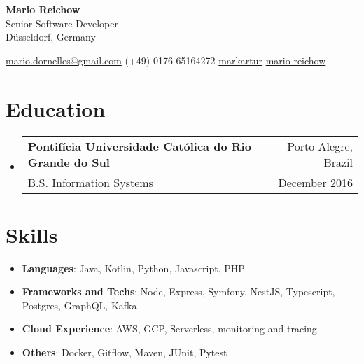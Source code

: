 \documentclass[letterpaper,11pt]{article}
\makeatletter
\newcommand{\resumeItem}[2]{
  \item\small{
    \textbf{#1}{: #2 \vspace{-2pt}}
  }
}
\newcommand{\resumeSubheading}[4]{
  \vspace{-1pt}\item
    \begin{tabular*}{0.98\textwidth}[t]{l@{\extracolsep{\fill}}r}
      \textbf{#1} & #2 \\
      {\small#3} & {\small #4} \\
    \end{tabular*}\vspace{-5pt}
}
\newcommand{\resumeSubItem}[2]{\resumeItem{#1}{#2}\vspace{-4pt}}
\renewcommand{\labelitemi}{}
\newcommand{\resumeSubHeadingListStart}{\begin{itemize}[leftmargin=*]}
\newcommand{\resumeSubHeadingListEnd}{\end{itemize}}
\makeatother
\begin{document}

\textbf{\LARGE Mario Reichow}\\
Senior Software Developer\\
Düsseldorf, Germany\\\vspace{\baselineskip}

{\Centering %

\raisebox{-0.20\height}{\Large \faInbox} \space \href{mailto:mario.dornelles@gmail.com}{mario.dornelles@gmail.com} \hfill %
\raisebox{-0.20\height}{\Large \faPhone} \space (+49) 0176 65164272 \hfill %
\raisebox{-0.20\height}{\Large \faGithub} \space \href{https://github.com/markartur}{markartur} \hfill %
\raisebox{-0.20\height}{\Large \faLinkedinSquare} \space \href{https://www.linkedin.com/in/mario-reichow/}{mario-reichow} %
} %


\section{Education}
  \resumeSubHeadingListStart
    \resumeSubheading
      {Pontifícia Universidade Católica do Rio Grande do Sul}{Porto Alegre, Brazil}
      {B.S. Information Systems}{December 2016}	
  \resumeSubHeadingListEnd



\section{Skills}
  \resumeSubHeadingListStart
    \resumeSubItem{Languages}
      {Java, Kotlin, Python, Javascript, PHP}
    \resumeSubItem{Frameworks and Techs}
      {Node, Express, Symfony, NestJS, Typescript, Postgres, GraphQL, Kafka}
    \resumeSubItem{Cloud Experience}
      {AWS, GCP, Serverless, monitoring and tracing } 
    \resumeSubItem{Others}
      {Docker, Gitflow, Maven, JUnit, Pytest}
  \resumeSubHeadingListEnd

\renewcommand{\labelitemi}{}

\end{document}
